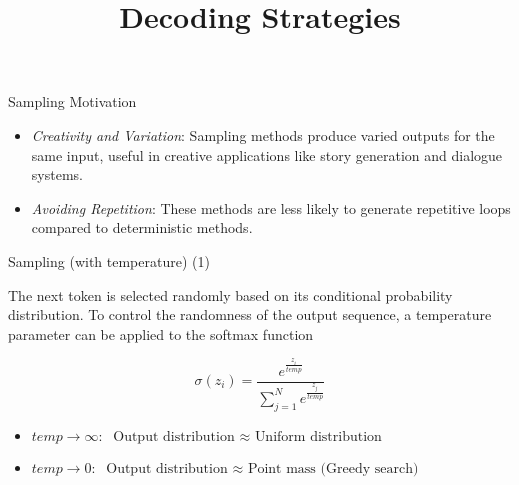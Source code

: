 



\newcommand{\learninggoals}{
\item Get to know different stochastic decoding strategies
\item Learn about sampling with temperature, top-k sampling and top-p (nucleus) sampling
\item learn about contrastive search and contrastive decoding
}
\def\myblue#1{\textcolor{texblue}{#1}}

\title{Decoding Strategies}
\date{}




\begin{vbframe}{Sampling Motivation}

\vfill
    
\begin{itemize}
    \item \textit{Creativity and Variation}: Sampling methods produce varied outputs for the same input, useful in creative applications like story generation and dialogue systems.
    \item \textit{Avoiding Repetition}: These methods are less likely to generate repetitive loops compared to deterministic methods.
\end{itemize}

\vfill

\end{vbframe}


\begin{vbframe}{Sampling (with temperature) (1)}



The next token is selected randomly based on its conditional probability distribution. To control the randomness of the output sequence, a temperature parameter can be applied to the softmax function

\vfill 

$$
\sigma\left(z_i\right)=\frac{e^{\frac{z_i}{temp}}}{\sum_{j=1}^N e^{\frac{z_j}{temp}}}
$$

\vfill

\begin{itemize}
\item $temp \rightarrow \infty: \text{ Output distribution $\approx$ Uniform distribution}$
\item $temp \rightarrow 0: \text{ Output distribution $\approx$ Point mass (Greedy search) }$
\end{itemize}



\end{vbframe}

